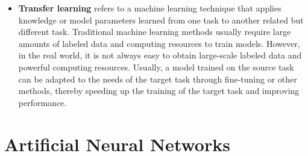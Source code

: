 \documentclass[english,version-2022-01]{uzl-thesis}
\begin{document}
\begin{itemize}
    \item \textbf{Transfer learning} refers to a machine learning technique that applies knowledge or model parameters learned from one task to another related but different task. Traditional machine learning methods usually require large amounts of labeled data and computing resources to train models. However, in the real world, it is not always easy to obtain large-scale labeled data and powerful computing resources. Usually, a model trained on the source task can be adapted to the needs of the target task through fine-tuning or other methods, thereby speeding up the training of the target task and improving performance.\cite{Bozinovski2020ReminderOT}
\end{itemize}

\section{Artificial Neural Networks}
\end{document}
